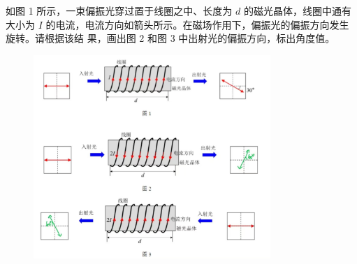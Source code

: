 \documentclass[signature=data]{physicsreport}
\begin{document}
如图 1 所示，一束偏振光穿过置于线圈之中、长度为 $d$ 的磁光晶体，线圈中通有大小为
$I$ 的电流，电流方向如箭头所示。在磁场作用下，偏振光的偏振方向发生旋转。请根据该结
果，画出图 2 和图 3 中出射光的偏振方向，标出角度值。

\begin{figure}[H]
    \centering
    \includegraphics[width=0.8\textwidth]{./images/lab11/T4.jpg}
    
    \label{fig:magneto_optic_effect}
\end{figure}
\end{document}
